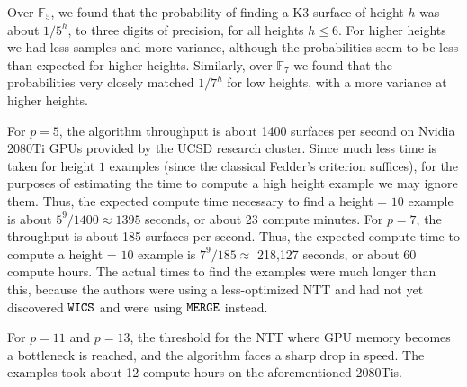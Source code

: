 Over \(\mathbb{F}_{5}\), we 
found that the probability of finding a K3 surface
of height \(h\) was about \(1 / 5^{h}\), to three digits
of precision, for all heights \(h \leq 6\).
For higher heights we had less samples
and more variance, although
the probabilities seem to be less than expected
for higher heights.
Similarly, over \(\mathbb{F}_{7}\) we found that
the probabilities very closely matched \(1 / 7^{h}\) 
for low heights, with a more variance at higher heights.

For \(p=5\), the algorithm throughput is about
1400 surfaces per second on 
Nvidia 2080Ti GPUs provided by the 
UCSD research cluster.
Since much less time is taken for height \(1\) examples
(since the classical Fedder's criterion suffices), 
for the purposes of estimating the time to compute a
high height example we may ignore them.
Thus,
the expected compute time necessary to find a height = \(10\) 
example is about  \(5^{9} / 1400 \approx 1395\) seconds, or about 
23 compute minutes.
For \(p=7\), the throughput is about 185 surfaces
per second.
Thus, the expected compute time to compute
a height = \(10\) example is 
\(7^{9} / 185 \approx \) 218,127 seconds, or about 
60 compute hours.
The actual times to find the examples were much 
longer than this, because the authors were using a 
less-optimized NTT and had not yet discovered $\wicsalg$
and were using \(\merge\) instead.

For $p = 11$ and $p = 13$, the threshold for the NTT where 
GPU memory becomes a bottleneck is reached, and the algorithm 
faces a sharp drop in speed. The examples took about 12 compute hours
on the aforementioned 2080Tis.

